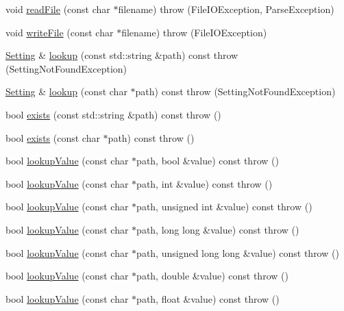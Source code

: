 \begin{DoxyCompactItemize}
\item 
void \hyperlink{classlibconfig_1_1_config_a31bc78ca36d4081560de025cbb08c022}{readFile} (const char $\ast$filename)  throw (FileIOException, ParseException)
\item 
void \hyperlink{classlibconfig_1_1_config_a9ee45e1ab444c2865bf076fbf4219326}{writeFile} (const char $\ast$filename)  throw (FileIOException)
\item 
\hyperlink{classlibconfig_1_1_setting}{Setting} \& \hyperlink{classlibconfig_1_1_config_a0e7f37e3f8a08f35a77778de99515c6e}{lookup} (const std::string \&path) const   throw (SettingNotFoundException)
\item 
\hyperlink{classlibconfig_1_1_setting}{Setting} \& \hyperlink{classlibconfig_1_1_config_adcfc1c6a6c7e43e5ac79d1e534fa0744}{lookup} (const char $\ast$path) const   throw (SettingNotFoundException)
\item 
bool \hyperlink{classlibconfig_1_1_config_a1fa3eb517f8a6722b170322b5abdad15}{exists} (const std::string \&path) const   throw ()
\item 
bool \hyperlink{classlibconfig_1_1_config_a548166ff5b36227a295489a86c5024c8}{exists} (const char $\ast$path) const   throw ()
\item 
bool \hyperlink{classlibconfig_1_1_config_abbf777fd9ef13502f049c3cbd8e1742e}{lookupValue} (const char $\ast$path, bool \&value) const   throw ()
\item 
bool \hyperlink{classlibconfig_1_1_config_ae82a77068c32d45ac0a006343f6cbec8}{lookupValue} (const char $\ast$path, int \&value) const   throw ()
\item 
bool \hyperlink{classlibconfig_1_1_config_a1021af7dfe97eb838d9a9892bd5b8339}{lookupValue} (const char $\ast$path, unsigned int \&value) const   throw ()
\item 
bool \hyperlink{classlibconfig_1_1_config_a50124b872c6412045dca2c89a4a71cca}{lookupValue} (const char $\ast$path, long long \&value) const   throw ()
\item 
bool \hyperlink{classlibconfig_1_1_config_a9b6cda1b3a631f7f9c912405f96a3601}{lookupValue} (const char $\ast$path, unsigned long long \&value) const   throw ()
\item 
bool \hyperlink{classlibconfig_1_1_config_ac1d8313aba68010ec75a52e1f19cdd90}{lookupValue} (const char $\ast$path, double \&value) const   throw ()
\item 
bool \hyperlink{classlibconfig_1_1_config_a493217a12b64307ed2917c7ea286e24e}{lookupValue} (const char $\ast$path, float \&value) const   throw ()

\end{DoxyCompactItemize}

